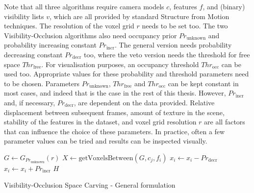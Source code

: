 Note that all three algorithms require camera models $c$, features $f$, and (binary) visibility lists $v$, which are all provided by standard Structure from Motion techniques. The resolution of the voxel grid $r$ needs to be set too. The two Visibility-Occlusion algorithms also need occupancy prior $Pr_{\textrm{unknown}}$ and probability increasing constant $Pr_{\textrm{incr}}$. The general version needs probability decreasing constant $Pr_{\textrm{decr}}$ too, where the veto version needs the threshold for free space $Thr_{\textrm{free}}$. For visualisation purposes, an occupancy threshold $Thr_{\textrm{occ}}$ can be used too. Appropriate values for these probability and threshold parameters need to be chosen. Parameters $Pr_{\textrm{unknown}}$, $Thr_{\textrm{free}}$ and $Thr_{\textrm{occ}}$ can be kept constant in most cases, and indeed that is the case in the rest of this thesis. However, $Pr_{\textrm{incr}}$ and, if necessary, $Pr_{\textrm{decr}}$, are dependent on the data provided. Relative displacement between subsequent frames, amount of texture in the scene, stability of the features in the dataset, and voxel grid resolution $r$ are all factors that can influence the choice of these parameters. In practice, often a few parameter values can be tried and results can be inspected visually.

{\singlespacing
\begin{algorithm}[!h]
  \centering
  \begin{algorithmic}[1]
      \State $G \gets G_{Pr_{\textrm{unknown}}}(r)$ 
           
            \State $X \gets \mathrm{getVoxelsBetween}(G, c_j, f_i)$ 
             
                \State $x_i \gets x_i - Pr_{\textrm{decr}}$ 
              \EndFor
            \Else {}
                \State $x_i \gets x_i + Pr_{\textrm{incr}}$ 
              \EndFor
            \EndIf
          \EndIf
        \EndFor
      \EndFor
      \State \Return $H$
    \EndFunction
  \end{algorithmic}
  \caption{Visibility-Occlusion Space Carving - General formulation}
  \label{alg:vis-occ-carving}
\end{algorithm}
}

